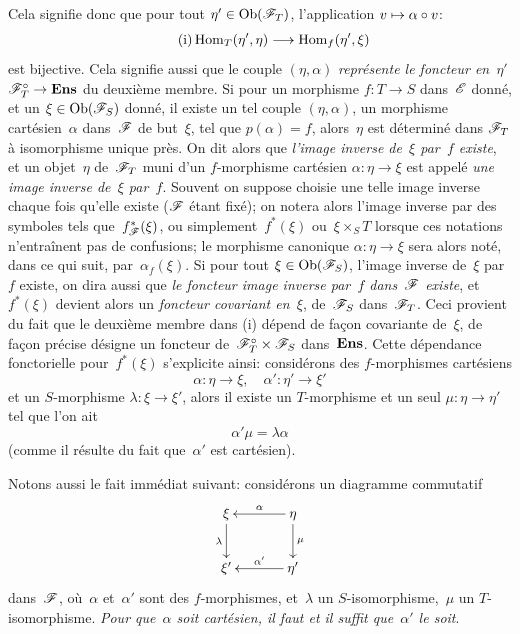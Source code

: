 Cela signifie donc que pour tout $\eta'\in\Ob(\cal{F}_T)$,
l'application $v \mto \alpha\circ v$:
\begin{equation}
\tag{i} \Hom_T(\eta',\eta) \to \Hom_f(\eta',\xi)
\end{equation}
est bijective. Cela signifie aussi que le couple $(\eta,\alpha)$
\emph{représente le foncteur en~$\eta'$} $\cal{F}^{\circ}_T \to
\Ens$ du deuxi\`eme membre. Si pour un morphisme $f\colon T \to S$
dans~$\cal{E}$ donn\'e, et un $\xi \in \Ob(\cal{F}_S)$ donn\'e, il
existe un tel couple $(\eta,\alpha)$, \ie un morphisme
cart\'esien~$\alpha$ dans~$\cal{F}$ de but~$\xi$, tel que
$p(\alpha)=f$, alors~$\eta$ est d\'etermin\'e dans $\cal{F}_T$
\`a isomorphisme unique pr\`es. On dit alors que \emph{l'image
inverse de~$\xi$ par~$f$ existe}, et un objet~$\eta$ de~$\cal{F}_T$
muni d'un $f$-morphisme cart\'esien $\alpha\colon \eta \to \xi$ est
appel\'e \emph{une image inverse de~$\xi$ par~$f$}.
Souvent on suppose
choisie
une telle image inverse chaque fois qu'elle existe ($\cal{F}$
\'etant fix\'e); on notera alors l'image inverse par des symboles
tels que~$f^*_{\cal{F}}(\xi)$, ou simplement~$f^*(\xi)$
\label{indnot:fo}ou~$\xi \times_S T$
lorsque ces notations n'entra\^inent pas
de confusions;
le morphisme canonique $\alpha\colon \eta \to \xi$ sera alors
not\'e, dans ce qui suit, par~$\alpha_f(\xi)$.
\label{indnot:fp}Si pour tout $\xi \in \Ob(\cal{F}_S)$, l'image inverse de~$\xi$
par~$f$ existe, on dira aussi que \emph{le foncteur image inverse
par~$f$ dans~$\cal{F}$ existe}, et~$f^*(\xi)$ devient alors un
\emph{foncteur covariant en~$\xi$}, de~$\cal{F}_S$ dans~$\cal{F}_T$.
Ceci provient du fait que le deuxi\`eme membre dans (i) d\'epend
de fa\c con covariante de~$\xi$, \ie de fa\c con pr\'ecise
d\'esigne un foncteur de~$\cal{F}^{\circ}_T \times \cal{F}_S$
dans~$\mathbf{Ens}$. Cette d\'ependance fonctorielle pour~$f^*(\xi)$
s'explicite ainsi: consid\'erons des $f$-morphismes cart\'esiens
$$
\alpha\colon \eta \to \xi, \quad \alpha'\colon \eta' \to \xi'
$$
et un $S$-morphisme $\lambda\colon \xi \to \xi'$, alors il existe un
$T$-morphisme et un seul $\mu\colon \eta\to\eta'$ tel que l'on ait
$$
\alpha' \mu = \lambda \alpha
$$
(comme il r\'esulte du fait que~$\alpha'$ est cart\'esien).

Notons aussi le fait imm\'ediat suivant: consid\'erons un
diagramme commutatif
$$
\xymatrix@C=1.2cm{{\xi}\ar[d]_-{\lambda}&{\eta}\ar[l]_-{\alpha}\ar[d]^-{\mu}\\{\xi'}&{\eta'}\ar[l]_-{\alpha'}}
$$
dans~$\cal{F}$,
o\`u~$\alpha$ et~$\alpha'$ sont des $f$-morphismes, et~$\lambda$ un
$S$-isomorphisme,~$\mu$ un $T$-isomorphisme. \emph{Pour que~$\alpha$
soit cartésien, il faut et il suffit que~$\alpha'$ le
soit}.

